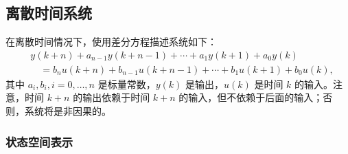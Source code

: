 \documentclass[UTF8,12pt,a4paper]{ctexart}
\theoremstyle{definition}
\begin{document}
\subsection{离散时间系统}

在离散时间情况下，使用差分方程描述系统如下：
\begin{equation}\label{eq:2.2.12}
\begin{aligned}
&y(k+n) + a_{n-1}y(k+n-1) + \cdots + a_1y(k+1) + a_0y(k) \\
&\quad = b_n u(k+n) + b_{n-1} u(k+n-1) + \cdots + b_1 u(k+1) + b_0 u(k),
\end{aligned}
\end{equation}
其中 $a_i, b_i, i=0,\ldots,n$ 是标量常数，$y(k)$ 是输出，$u(k)$ 是时间 $k$ 的输入。注意，时间 $k+n$ 的输出依赖于时间 $k+n$ 的输入，但不依赖于后面的输入；否则，系统将是非因果的。

\subsubsection{状态空间表示}
\end{document}
